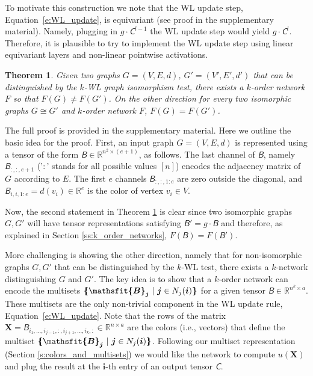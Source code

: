 \documentclass{article}
\newcommand{\mmset}[1]{\{\kern-.4em\{ #1 \}\kern-.4em\}}
\newcommand{\Real}{\mathbb R}
\newtheorem{theorem}{Theorem}
\newcommand{\ie}{{i.e.}}
\def\Eqref#1{Equation~\ref{#1}}
\def\vi{{\bm{i}}}
\def\vj{{\bm{j}}}
\def\mX{{\bm{X}}}
\newcommand{\tens}[1]{\bm{\mathsfit{#1}}}
\def\tB{{\tens{B}}}
\def\tC{{\tens{C}}}
\begin{document}
To motivate this construction we note that the WL update step, \Eqref{e:WL_update}, is equivariant (see proof in the supplementary material). Namely, plugging in $g\cdot \tC^{l-1}$ the WL update step would yield $g\cdot \tC^l$. Therefore, it is plausible to try to implement the WL update step using linear equivariant layers and non-linear pointwise activations. 


\begin{theorem}\label{thm:k_wl_k_order}
Given two graphs $G=(V,E,d)$, $G'=(V',E',d')$ that can be distinguished by the $k$-WL graph isomorphism test, there exists a $k$-order network $F$ so that $F(G)\ne F(G')$. On the other direction for every two isomorphic graphs $G\cong G'$ and $k$-order network $F$, $F(G)=F(G')$.
\end{theorem}
The full proof is provided in the supplementary material. Here we outline the basic idea for the proof. First, an input graph $G=(V,E,d)$ is represented using a tensor of the form  $\tB \in \Real^{n^2\times (e+1)}$, as follows. 
The last channel of $\tB$, namely $\tB_{:,:,e+1}$ ('$:$' stands for all possible values $[n]$) encodes the adjacency matrix of $G$ according to $E$. The first $e$ channels $\tB_{:,:,1:e}$ are zero outside the diagonal, and $\tB_{i,i,1:e}=d(v_i)\in\Real^e$ is the color of vertex $v_i\in V$. 

Now, the second statement in Theorem \ref{thm:k_wl_k_order} is clear since two isomorphic graphs $G,G'$ will have tensor representations satisfying $\tB'=g\cdot \tB$ and therefore, as explained in Section \ref{ss:k_order_networks}, $F(\tB)=F(\tB')$. 

More challenging is showing the other direction, namely that for non-isomorphic graphs  $G,G'$ that can be distinguished by the $k$-WL test, there exists a $k$-network distinguishing $G$ and $G'$. The key idea is to show that a $k$-order network can encode the multisets $\mmset{\tB_\vj \ \vert \ \vj\in N_j(\vi)}$ for a given tensor $\tB\in\Real^{n^k\times a}$. These multisets are the only non-trivial component in the WL update rule, \Eqref{e:WL_update}. 
Note that the rows of the matrix $\mX = \tB_{i_1,\ldots,i_{j-1},:,i_{j+1},\ldots,i_k,:} \in \Real^{n\times a}$ are the colors (\ie, vectors) that define the multiset $\mmset{\tB_\vj \ \vert \ \vj\in N_j(\vi)}$. Following our multiset representation (Section \ref{s:colors_and_multisets}) we would like the network to compute $u(\mX)$ and plug the result at the $\vi$-th entry of an output tensor $\tC$. 
\end{document}
